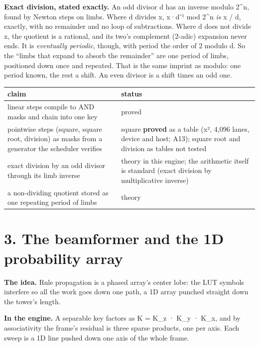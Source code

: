 \textbf{Exact division, stated exactly.} An odd divisor d has an inverse modulo 2\textasciicircum{}n, found by Newton steps on limbs. Where d divides x, x·d⁻¹ mod 2\textasciicircum{}n \emph{is} x / d, exactly, with no remainder and no loop of subtractions. Where d does not divide x, the quotient is a rational, and its two's complement (2-adic) expansion never ends. It is \emph{eventually periodic}, though, with period the order of 2 modulo d. So the “limbs that expand to absorb the remainder” are one period of limbs, positioned down once and repeated. That is the same imprint as modulo: one period known, the rest a shift. An even divisor is a shift times an odd one.

{\small
\setlength{\tabcolsep}{6pt}
\begin{longtable}{>{\RaggedRight\arraybackslash}p{}>{\RaggedRight\arraybackslash}p{}}
\toprule
claim & status \\
\midrule
\endhead
linear steps compile to AND masks and chain into one key & proved \\
pointwise steps (square, square root, division) as masks from a generator the scheduler verifies & square \textbf{proved} as a table (x², 4,096 lanes, device and host; A13); square root and division as tables not tested \\
exact division by an odd divisor through its limb inverse & theory in this engine; the arithmetic itself is standard (exact division by multiplicative inverse) \\
a non-dividing quotient stored as one repeating period of limbs & theory \\
\bottomrule
\end{longtable}
}

\section{\texorpdfstring{3. The beamformer and the 1D probability array}{3. The beamformer and the 1D probability array}}

\textbf{The idea.} Rule propagation is a phased array's center lobe: the LUT symbols interfere so all the work goes down one path, a 1D array punched straight down the tower's length.

\textbf{In the engine.} A separable key factors as K = K\_\allowbreak{}z · K\_\allowbreak{}y · K\_\allowbreak{}x, and by associativity the frame's residual is three sparse products, one per axis. Each sweep is a 1D line pushed down one axis of the whole frame.

